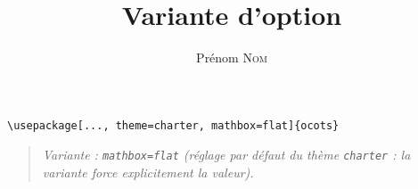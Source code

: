 \documentclass[11pt]{ocots-book}
\title{Variante d'option}
\author{Prénom \textsc{Nom}}
\newcommand{\ocotsvariantnote}[1]{\begin{quote}\itshape Variante : #1\end{quote}}
\begin{document}
\maketitle

\begin{lstlisting}
\usepackage[..., theme=charter, mathbox=flat]{ocots}
\end{lstlisting}
\ocotsvariantnote{\texttt{mathbox=flat} (r\'eglage par d\'efaut du th\`eme \texttt{charter} : la variante force explicitement la valeur).}

\end{document}
